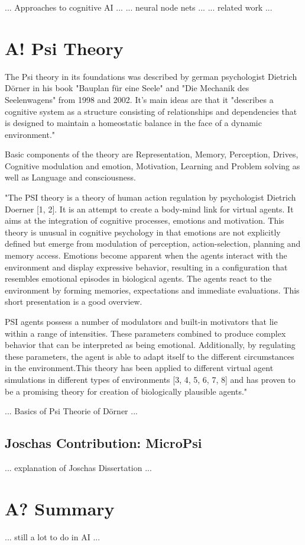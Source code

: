 ... Approaches to cognitive AI ...
... neural node nets ...
... related work ...

\section{A! Psi Theory}
The Psi theory in its foundations was described by german psychologist Dietrich Dörner in his book "Bauplan für eine Seele" and "Die Mechanik des Seelenwagens" from 1998 and 2002. It's main ideas are that it "describes a cognitive system as a structure consisting of relationships and dependencies that is designed to maintain a homeostatic balance in the face of a dynamic environment."

Basic components of the theory are Representation, Memory, Perception, Drives, Cognitive modulation and emotion, Motivation, Learning and Problem solving as well as Language and consciousness.

"The PSI theory is a theory of human action regulation by psychologist Dietrich Doerner [1, 2]. It is an attempt to create a body-mind link for virtual agents. It aims at the integration of cognitive processes, emotions and motivation. This theory is unusual in cognitive psychology in that emotions are not explicitly defined but emerge from modulation of perception, action-selection, planning and memory access. Emotions become apparent when the agents interact with the environment and display expressive behavior, resulting in a configuration that resembles emotional episodes in biological agents. The agents react to the environment by forming memories, expectations and immediate evaluations. This short presentation is a good overview.

PSI agents possess a number of modulators and built-in motivators that lie within a range of intensities. These parameters combined to produce complex behavior that can be interpreted as being emotional. Additionally, by regulating these parameters, the agent is able to adapt itself to the different circumstances in the environment.This theory has been applied to different virtual agent simulations in different types of environments [3, 4, 5, 6, 7, 8] and has proven to be a promising theory for creation of biologically plausible agents."


... Basics of Psi Theorie of Dörner ...

\subsection{Joschas Contribution: MicroPsi}
... explanation of Joschas Dissertation ...

\section{A? Summary}
... still a lot to do in AI ...